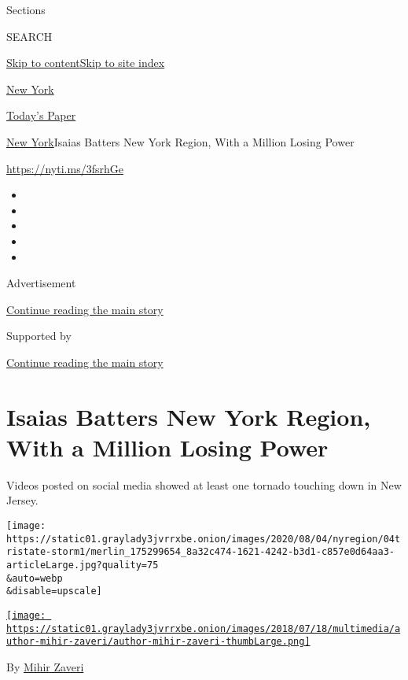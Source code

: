 Sections

SEARCH

\protect\hyperlink{site-content}{Skip to
content}\protect\hyperlink{site-index}{Skip to site index}

\href{https://www.nytimes3xbfgragh.onion/section/nyregion}{New York}

\href{https://myaccount.nytimes3xbfgragh.onion/auth/login?response_type=cookie\&client_id=vi}{}

\href{https://www.nytimes3xbfgragh.onion/section/todayspaper}{Today's
Paper}

\href{/section/nyregion}{New York}\textbar{}Isaias Batters New York
Region, With a Million Losing Power

\url{https://nyti.ms/3fsrhGe}

\begin{itemize}
\item
\item
\item
\item
\item
\end{itemize}

Advertisement

\protect\hyperlink{after-top}{Continue reading the main story}

Supported by

\protect\hyperlink{after-sponsor}{Continue reading the main story}

\hypertarget{isaias-batters-new-york-region-with-a-million-losing-power}{%
\section{Isaias Batters New York Region, With a Million Losing
Power}\label{isaias-batters-new-york-region-with-a-million-losing-power}}

Videos posted on social media showed at least one tornado touching down
in New Jersey.

\texttt{[image: https://static01.graylady3jvrrxbe.onion/images/2020/08/04/nyregion/04tristate-storm1/merlin\_175299654\_8a32c474-1621-4242-b3d1-c857e0d64aa3-articleLarge.jpg?quality=75\\\&auto=webp\\\&disable=upscale]}

\href{https://www.nytimes3xbfgragh.onion/by/mihir-zaveri}{\texttt{[image: https://static01.graylady3jvrrxbe.onion/images/2018/07/18/multimedia/author-mihir-zaveri/author-mihir-zaveri-thumbLarge.png]}}

By \href{https://www.nytimes3xbfgragh.onion/by/mihir-zaveri}{Mihir
Zaveri}

